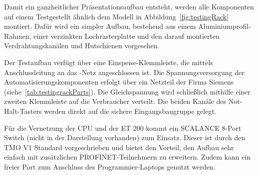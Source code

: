 \nopagebreak



Damit ein ganzheitlicher Präsentationsaufbau entsteht, werden alle Komponenten auf einem Testgestellt ähnlich dem Modell in Abbildung~\ref{fig:testingRack} montiert. Dafür wird ein simpler Aufbau, bestehend aus einem Aluminiumprofil-Rahmen, einer verzinkten Lochrasterplatte und den darauf montierten Verdrahtungskanälen und Hutschienen vorgesehen. 

Der Testaufbau verfügt über eine Einspeise-Klemmleiste, die mittels Anschlussleitung an das -Netz angeschlossen ist. Die Spannungsversorgung der Automatisierungskomponenten erfolgt über ein Netzteil der Firma Siemens (siehe~\ref{tab:testingrackParts}). Die  Gleichspannung wird schließlich mithilfe einer zweiten Klemmleiste auf die Verbraucher verteilt. Die beiden Kanäle des Not-Halt-Tasters werden direkt auf die sichere Eingangsbaugruppe gelegt.


Für die Vernetzung der CPU und der ET 200 kommt ein SCALANCE 8-Port Switch (nicht in der Darstellung vorhanden) zum Einsatz. Dieser ist durch den TMO V1 Standard vorgeschrieben und bietet den Vorteil, den Aufbau sehr einfach mit zusätzlichen PROFINET-Teilnehmern zu erweitern. Zudem kann ein freier Port zum Anschluss des Programmier-Laptops genutzt werden.




